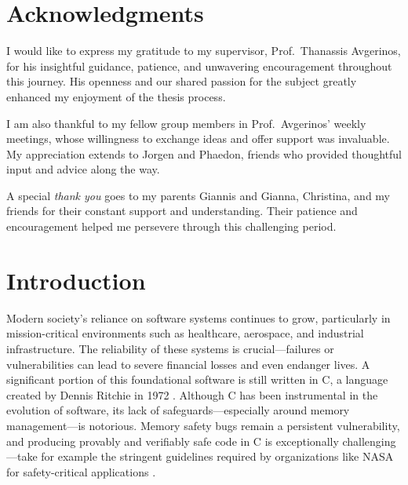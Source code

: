 \documentclass[
  a4paper,
]{scrreprt}
\newcommand*\listoflistings{\listof{codelisting}{List of Listings}}
\theoremstyle{definition}
\theoremstyle{remark}
\begin{document}

\chapter*{Acknowledgments}\label{acknowledgments}


I would like to express my gratitude to my supervisor, Prof.~Thanassis
Avgerinos, for his insightful guidance, patience, and unwavering
encouragement throughout this journey. His openness and our shared
passion for the subject greatly enhanced my enjoyment of the thesis
process.

I am also thankful to my fellow group members in Prof.~Avgerinos' weekly
meetings, whose willingness to exchange ideas and offer support was
invaluable. My appreciation extends to Jorgen and Phaedon, friends who
provided thoughtful input and advice along the way.

A special \emph{thank you} goes to my parents Giannis and Gianna,
Christina, and my friends for their constant support and understanding.
Their patience and encouragement helped me persevere through this
challenging period.

\newpage{}

\tableofcontents
\listoffigures
\listoflistings
\listoftables

\newpage{}


\chapter{Introduction}\label{introduction}


Modern society's reliance on software systems continues to grow,
particularly in mission-critical environments such as healthcare,
aerospace, and industrial infrastructure. The reliability of these
systems is crucial---failures or vulnerabilities can lead to severe
financial losses and even endanger lives. A significant portion of this
foundational software is still written in C, a language created by
Dennis Ritchie in 1972 \autocite{kernighan1978,ritchie1978}. Although C
has been instrumental in the evolution of software, its lack of
safeguards---especially around memory management---is notorious. Memory
safety bugs remain a persistent vulnerability, and producing provably
and verifiably safe code in C is exceptionally challenging---take for
example the stringent guidelines required by organizations like NASA for
safety-critical applications \autocite{holzmann2006}.
\end{document}
